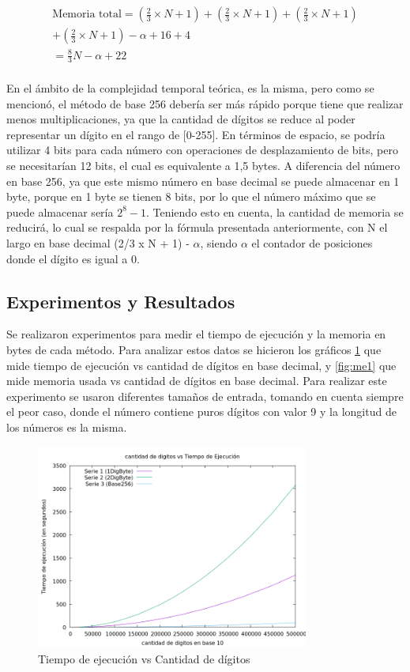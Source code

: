 \documentclass[10pt]{article}
\begin{document}
\begin{multline*}
\text{Memoria total} = \left(\frac{2}{3} \times N + 1\right) + \left(\frac{2}{3} \times N + 1\right) + \left(\frac{2}{3} \times N + 1\right) \\
+ \left(\frac{2}{3} \times N + 1\right) - \alpha + 16 + 4 \\
= \frac{8}{3}N - \alpha + 22
\end{multline*}\\
En el ámbito de la complejidad temporal teórica, es la misma, pero como se mencionó, el método de base 256 debería ser más rápido porque tiene que realizar menos multiplicaciones, ya que la cantidad de dígitos se reduce al poder representar un dígito en el rango de [0-255]. En términos de espacio, se podría utilizar 4 bits para cada número con operaciones de desplazamiento de bits, pero se necesitarían 12 bits, el cual es equivalente a 1,5 bytes. A diferencia del número en base 256, ya que este mismo número en base decimal se puede almacenar en 1 byte, porque en 1 byte se tienen 8 bits, por lo que el número máximo que se puede almacenar sería $2^8 - 1$. Teniendo esto en cuenta, la cantidad de memoria se reducirá, lo cual se respalda por la fórmula presentada anteriormente, con N el largo en base decimal (2/3 x N + 1) - $\alpha$, siendo $\alpha$ el contador de posiciones donde el dígito es igual a 0.

\subsection{Experimentos y Resultados}

Se realizaron experimentos para medir el tiempo de ejecución y la memoria en bytes de cada método. Para analizar estos datos se hicieron los gráficos \ref{fig:ti1} que mide tiempo de ejecución vs cantidad de dígitos en base decimal, y \ref{fig:me1} que mide memoria usada vs cantidad de dígitos en base decimal. Para realizar este experimento se usaron diferentes tamaños de entrada, tomando en cuenta siempre el peor caso, donde el número contiene puros dígitos con valor 9 y la longitud de los números es la misma.

\begin{figure}[H]
    \centering
    \includegraphics[width=0.8\textwidth]{tiempoDeEjecuccion.png}
    \caption{Tiempo de ejecución vs Cantidad de dígitos}
    \label{fig:ti1}
\end{figure}
\end{document}
